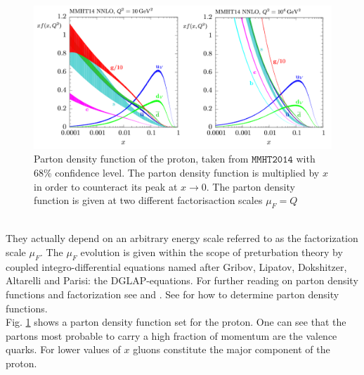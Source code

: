 \begin{figure}[!htbp]
\begin{center}
\includegraphics[scale=0.6]{figures/pdf's}
\caption{Parton density function of the proton, taken from $\mathtt{MMHT2014}$ \cite{Harland-Lang:2014zoa} with 68\% confidence level. The parton density function is multiplied by $x$ in order to counteract its peak at $x \to 0$. The parton density function is given at two different factorisaction scales $\mu_F = Q$}\label{fig:pdfs}
\end{center}
\end{figure}\\
They actually depend on an arbitrary energy scale referred to as the factorization scale $\mu_F$. The $\mu_F$ evolution is given within the scope of preturbation theory by coupled integro-differential equations named after Gribov, Lipatov, Dokshitzer, Altarelli and Parisi: the DGLAP-equations. For further reading on parton density functions and factorization see \cite{dissertori2003quantum} and \cite{Collins:1989gx}. See \cite{Brock:1993sz} for how to determine parton density functions.\\
Fig. \ref{fig:pdfs} shows a parton density function set for the proton. One can see that the partons most probable to carry a high fraction of momentum are the valence quarks. For lower values of $x$ gluons constitute the major component of the proton.
